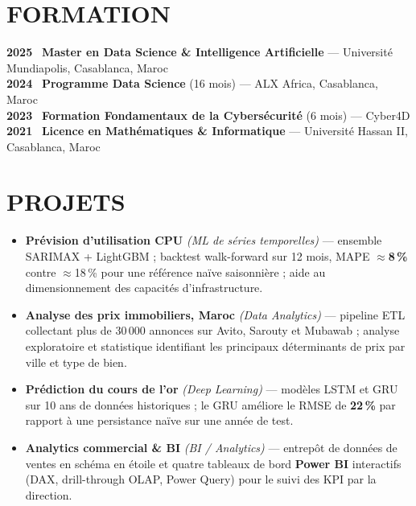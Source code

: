 \documentclass[10pt,a4paper]{article}
\begin{document}
\section*{FORMATION}
\small
\textbf{2025} \textbar\ \textbf{Master en Data Science \& Intelligence Artificielle} — Université Mundiapolis, Casablanca, Maroc\\
\textbf{2024} \textbar\ \textbf{Programme Data Science} (16 mois) — ALX Africa, Casablanca, Maroc\\
\textbf{2023} \textbar\ \textbf{Formation Fondamentaux de la Cybersécurité} (6 mois) — Cyber4D\\
\textbf{2021} \textbar\ \textbf{Licence en Mathématiques \& Informatique} — Université Hassan II, Casablanca, Maroc

\section*{PROJETS}
\begin{itemize}
    \item \textbf{Prévision d'utilisation CPU} \textit{(ML de séries temporelles)} — ensemble SARIMAX + LightGBM ; backtest walk-forward sur 12 mois, MAPE $\approx$\textbf{8\,\%} contre $\approx$18\,\% pour une référence naïve saisonnière ; aide au dimensionnement des capacités d'infrastructure.
    \item \textbf{Analyse des prix immobiliers, Maroc} \textit{(Data Analytics)} — pipeline ETL collectant plus de 30\,000 annonces sur Avito, Sarouty et Mubawab ; analyse exploratoire et statistique identifiant les principaux déterminants de prix par ville et type de bien.
    \item \textbf{Prédiction du cours de l'or} \textit{(Deep Learning)} — modèles LSTM et GRU sur 10 ans de données historiques ; le GRU améliore le RMSE de \textbf{22\,\%} par rapport à une persistance naïve sur une année de test.
    \item \textbf{Analytics commercial \& BI} \textit{(BI / Analytics)} — entrepôt de données de ventes en schéma en étoile et quatre tableaux de bord \textbf{Power BI} interactifs (DAX, drill-through OLAP, Power Query) pour le suivi des KPI par la direction.
\end{itemize}
\end{document}
